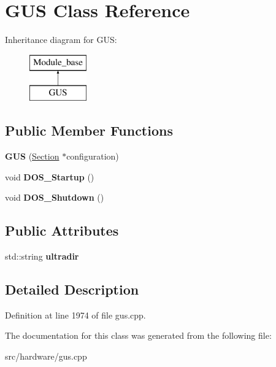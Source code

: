 \hypertarget{classGUS}{\section{G\-U\-S Class Reference}
\label{classGUS}
}
Inheritance diagram for G\-U\-S\-:\begin{figure}[H]
\begin{center}
\leavevmode
\includegraphics[height=2.000000cm]{classGUS}
\end{center}
\end{figure}
\subsection*{Public Member Functions}
\begin{DoxyCompactItemize}
\item 
\hypertarget{classGUS_a4ee14e2fc1aae1aef9cc6306d227dbf2}{{\bfseries G\-U\-S} (\hyperlink{classSection}{Section} $\ast$configuration)}\label{classGUS_a4ee14e2fc1aae1aef9cc6306d227dbf2}

\item 
\hypertarget{classGUS_aeb099ead25e3d56aeb70ecf72a85f14f}{void {\bfseries D\-O\-S\-\_\-\-Startup} ()}\label{classGUS_aeb099ead25e3d56aeb70ecf72a85f14f}

\item 
\hypertarget{classGUS_a36434682ec12dc37bd71575231bf287d}{void {\bfseries D\-O\-S\-\_\-\-Shutdown} ()}\label{classGUS_a36434682ec12dc37bd71575231bf287d}

\end{DoxyCompactItemize}
\subsection*{Public Attributes}
\begin{DoxyCompactItemize}
\item 
\hypertarget{classGUS_a3f1bfc9fabf97294cd24f1631368729a}{std\-::string {\bfseries ultradir}}\label{classGUS_a3f1bfc9fabf97294cd24f1631368729a}

\end{DoxyCompactItemize}


\subsection{Detailed Description}


Definition at line 1974 of file gus.\-cpp.



The documentation for this class was generated from the following file\-:\begin{DoxyCompactItemize}
\item 
src/hardware/gus.\-cpp\end{DoxyCompactItemize}
